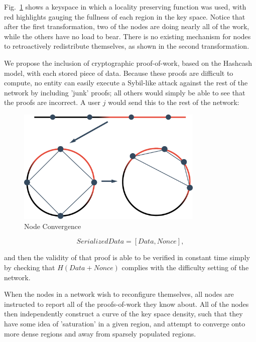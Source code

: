 \documentclass[10pt]{IEEEtran}
\begin{document}
\par Fig.~\ref{fig_kSpaceUneven} shows a keyspace in which a locality preserving function was used, with red highlights gauging the fullness of each region in the key space. Notice that after the first transformation, two of the nodes are doing nearly all of the work, while the others have no load to bear. There is no existing mechanism for nodes to retroactively redistribute themselves, as shown in the second transformation.


\par We propose the inclusion of cryptographic proof-of-work, based on the Hashcash~\cite{Back:2002vq} model, with each stored piece of data. Because these proofs are difficult to compute, no entity can easily execute a Sybil-like attack against the rest of the network by including 'junk' proofs; all others would simply be able to see that the proofs are incorrect. A user $j$ would send this to the rest of the network:

\begin{figure}[!t]
\centering
\includegraphics[width=3.5in]{unevenDistro}
\caption{Node Convergence}
\label{fig_kSpaceUneven}
\end{figure}

\begin{equation} \label{eq:proof}
SerializedData = [Data, Nonce],
\end{equation}

and then the validity of that proof is able to be verified in constant time simply by checking that $H(Data + Nonce)$ complies with the difficulty setting of the network.


\par When the nodes in a network wish to reconfigure themselves, all nodes are instructed to report all of the proofs-of-work they know about. All of the nodes then independently construct a curve of the key space density, such that they have some idea of 'saturation' in a given region, and attempt to converge onto more dense regions and away from sparsely populated regions.
\end{document}

